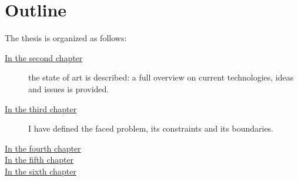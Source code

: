 \section{Outline}
%
\par The thesis is organized as follows:
%
%
\begin{description}
%
\item[{\hyperref[cap:statoarte]{In the second chapter}}] the state of art is described: a full overview on current technologies, ideas and issues is provided.
%
\item[{\hyperref[cap:probanalysis]{In the third chapter}}] I have defined the faced problem, its constraints and its boundaries. 

\item[{\hyperref[cap:proposedsolution]{In the fourth chapter}}] 

\item[{\hyperref[cap:proofofconcept]{In the fifth chapter}}]

\item[{\hyperref[cap:conclusions]{In the sixth chapter}}]
%
\end{description}
%
